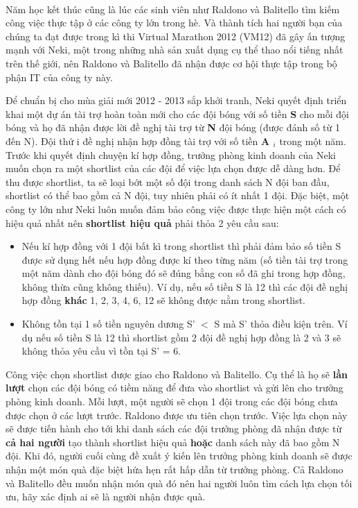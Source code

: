 

 

Năm học kết thúc cũng là lúc các sinh viên như Raldono và Balitello tìm kiếm công việc thực tập ở các công ty lớn trong hè. Và thành tích hai người bạn của chúng ta đạt được trong kì thi Virtual Marathon 2012 (VM12) đã gây ấn tượng mạnh với Neki, một trong những nhà sản xuất dụng cụ thể thao nổi tiếng nhất trên thế giới, nên Raldono và Balitello đã nhận được cơ hội thực tập trong bộ phận IT của công ty này.

Để chuẩn bị cho mùa giải mới 2012 - 2013 sắp khởi tranh, Neki quyết định triển khai một dự án tài trợ hoàn toàn mới cho các đội bóng với số tiền \textbf{ S } cho mỗi đội bóng và họ đã nhận được lời đề nghị tài trợ từ \textbf{ N } đội bóng (được đánh số từ 1 đến N). Đội thứ i đề nghị nhận hợp đồng tài trợ với số tiền \textbf{ A $_ i $} trong một năm. Trước khi quyết định chuyện kí hợp đồng, trưởng phòng kinh doanh của Neki muốn chọn ra một shortlist của các đội để việc lựa chọn được dễ dàng hơn. Để thu được shortlist, ta sẽ loại bớt một số đội trong danh sách N đội ban đầu, shortlist có thể bao gồm cả N đội, tuy nhiên phải có ít nhất 1 đội. Đặc biệt, một công ty lớn như Neki luôn muốn đảm bảo công việc được thực hiện một cách có hiệu quả nhất nên \textbf{ shortlist hiệu quả } phải thỏa 2 yêu cầu sau:
\begin{itemize}
	\item Nếu kí hợp đồng với 1 đội bất kì trong shortlist thì phải đảm bảo số tiền S được sử dụng hết nếu hợp đồng được kí theo từng năm (số tiền tài trợ trong một năm dành cho đội bóng đó sẽ đúng bằng con số đã ghi trong hợp đồng, không thừa cũng không thiếu). Ví dụ, nếu số tiền S là 12 thì các đội đề nghị hợp đồng \textbf{ khác } 1, 2, 3, 4, 6, 12 sẽ không được nằm trong shortlist.
\end{itemize}
\begin{itemize}
	\item Không tồn tại 1 số tiền nguyên dương S' $<$ S mà S' thỏa điều kiện trên. Ví dụ nếu số tiền S là 12 thì shortlist gồm 2 đội đề nghị hợp đồng là 2 và 3 sẽ không thỏa yêu cầu vì tồn tại S' = 6.
\end{itemize}

Công việc chọn shortlist được giao cho Raldono và Balitello. Cụ thể là họ sẽ \textbf{ lần lượt } chọn các đội bóng có tiềm năng để đưa vào shortlist và gửi lên cho trưởng phòng kinh doanh. Mỗi lượt, một người sẽ chọn 1 đội trong các đội bóng chưa được chọn ở các lượt trước. Raldono được ưu tiên chọn trước. Việc lựa chọn này sẽ được tiến hành cho tới khi danh sách các đội trưởng phòng đã nhận được từ \textbf{ cả hai người } tạo thành shortlist hiệu quả \textbf{ hoặc } danh sách này đã bao gồm N đội. Khi đó, người cuối cùng đề xuất ý kiến lên trưởng phòng kinh doanh sẽ được nhận một món quà đặc biệt hứa hẹn rất hấp dẫn từ trưởng phòng. Cả Raldono và Balitello đều muốn nhận món quà đó nên hai người luôn tìm cách lựa chọn tối ưu, hãy xác định ai sẽ là người nhận được quà.

